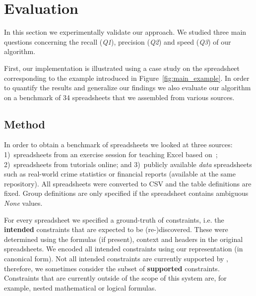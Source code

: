 
\newcommand{\runtotal}{16.12}
\newcommand{\runtotalstd}{0.62}

\newcommand{\runfile}{0.50}
\newcommand{\runfilestd}{0.02}

\newcommand{\benchsize}{??}

\section{Evaluation}\label{sec:evaluation}
In this section we experimentally validate our approach.
We studied three main questions concerning the recall (\textit{Q1}), precision (\textit{Q2}) and speed (\textit{Q3}) of our algorithm.

First, our implementation is illustrated using a case study on the spreadsheet corresponding to the example introduced in Figure~\ref{fig:main_example}.
In order to quantify the results and generalize our findings we also evaluate our algorithm on a benchmark of 34 spreadsheets that we assembled from various sources.

\subsection{Method}
\label{sec:evalualtion:method}
In order to obtain a benchmark of spreadsheets we looked at three sources:
1)~spreadsheets from an exercise session for teaching Excel based on~\cite{excel_book}; 2)~spreadsheets from tutorials online; and 3)~publicly available \textit{data} spreadsheets such as real-world crime statistics or financial reports (available at the same repository).
All spreadsheets were converted to CSV and the table definitions are fixed.
Group definitions are only specified if the spreadsheet contains ambiguous \textit{None} values. 

For every spreadsheet we specified a ground-truth of constraints, i.e. the \textbf{intended} constraints that are expected to be (re-)discovered.
These were determined using the formulas (if present), context and headers in the original spreadsheets.
We encoded all intended constraints using our representation (in canonical form).
Not all intended constraints are currently supported by \sname, therefore, we sometimes consider the subset of \textbf{supported} constraints.
Constraints that are currently outside of the scope of this system are, for example, nested mathematical or logical formulas.


